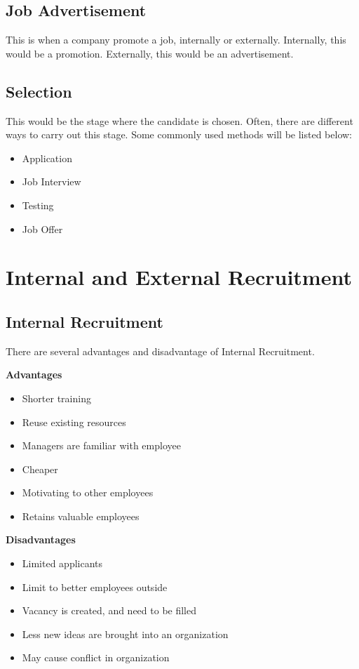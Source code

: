 \documentclass{report}
\begin{document}
\subsection{Job Advertisement}
This is when a company promote a job, internally or externally.
Internally, this would be a promotion.
Externally, this would be an advertisement.

\subsection{Selection}
This would be the stage where the candidate is chosen.
Often, there are different ways to carry out this stage.
Some commonly used methods will be listed below:
\begin{itemize}
	\item Application
	\item Job Interview
	\item Testing
	\item Job Offer
\end{itemize}

\section{Internal and External Recruitment}

\subsection{Internal Recruitment}
There are several advantages and disadvantage of Internal Recruitment.

\textbf{Advantages}\\
\begin{itemize}
	\item Shorter training
	\item Reuse existing resources
	\item Managers are familiar with employee
	\item Cheaper
	\item Motivating to other employees
	\item Retains valuable employees
\end{itemize}

\textbf{Disadvantages}\\
\begin{itemize}
	\item Limited applicants
	\item Limit to better employees outside
	\item Vacancy is created, and need to be filled
	\item Less new ideas are brought into an organization
	\item May cause conflict in organization
\end{itemize}
\end{document}
